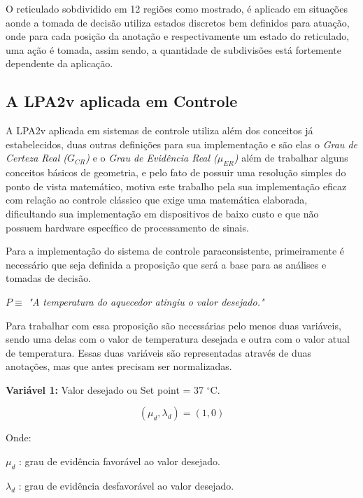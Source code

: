 O reticulado sobdividido em 12 regiões como mostrado, é aplicado em situações aonde a tomada de decisão utiliza estados discretos bem definidos para atuação, onde para cada posição da anotação e respectivamente um estado do reticulado, uma ação é tomada, assim sendo, a quantidade de subdivisões está fortemente dependente da aplicação.

\subsection{A LPA2v aplicada em Controle}

A LPA2v aplicada em sistemas de controle utiliza além dos conceitos já estabelecidos, duas outras definições para sua implementação e são elas o \emph{ Grau de Certeza Real ($G _{CR}$)} e o \emph{Grau de Evidência Real ($\mu _{ER}$)} além de trabalhar alguns conceitos básicos de geometria, e pelo fato de possuir uma resolução simples do ponto de vista matemático, motiva este trabalho pela sua implementação eficaz com relação ao controle clássico que exige uma matemática elaborada, dificultando sua implementação em dispositivos de baixo custo e que não possuem hardware específico de processamento de sinais. 


Para a implementação do sistema de controle paraconsistente, primeiramente é necessário que seja definida a proposição que será a base para as análises e tomadas de decisão.

\begin{center}
$ P \equiv $ 
\emph{"A temperatura do aquecedor atingiu o valor desejado."}
\end{center}

Para trabalhar com essa proposição são necessárias pelo menos duas variáveis, sendo uma delas com o valor de temperatura desejada e outra com o valor atual de temperatura. Essas duas variáveis são representadas através de duas anotações, mas que antes precisam ser normalizadas. 

\textbf{Variável 1:} 
Valor desejado ou Set point = 37 $^{\circ}$C. 

\begin{equation}
( \mu _{d}, \lambda _{d} ) = (1,0)
\label{eq:setpoint}
\end{equation}

Onde:

$\mu _{d}$ : grau de evidência favorável ao valor desejado. 

$\lambda _{d}$ : grau de evidência desfavorável ao valor desejado.

